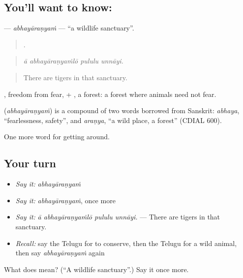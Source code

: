\subsection*{You'll want to know: }
\textbf{} — \emph{abhayāraṇyaṁ} — \textquotedblleft{}a wildlife sanctuary\textquotedblright{}.

\begin{quote}
   .
\end{quote}

\begin{quote}
\emph{ā abhayāraṇyaṁlō pululu unnāyi.}
\end{quote}

\begin{quote}
There are tigers in that sanctuary.
\end{quote}

, freedom from fear, + , a forest: a forest where animals need not fear.

\begin{cousinweb}
\textbf{} (\emph{abhayāraṇyaṁ}) is a compound of two words borrowed from Sanskrit: \emph{abhaya}, \textquotedblleft{}fearlessness, safety\textquotedblright{}, and \emph{araṇya}, \textquotedblleft{}a wild place, a forest\textquotedblright{} (CDIAL 600).
\end{cousinweb}

\begin{grammarlens}[title={What you've built}]
One more word for getting around.
\end{grammarlens}

\subsection*{Your turn}
\begin{itemize}
\raggedright
  \item \emph{Say it:} \emph{abhayāraṇyaṁ}
  \item \emph{Say it:} \emph{abhayāraṇyaṁ}, once more
  \item \emph{Say it:} \emph{ā abhayāraṇyaṁlō pululu unnāyi.} — There are tigers in that sanctuary.
  \item \emph{Recall:} say the Telugu for to conserve, then the Telugu for a wild animal, then say \emph{abhayāraṇyaṁ} again
\end{itemize}

\begin{tcolorbox}[breakable,colback=teal!4,colframe=teal!35!black,title={Before you move on}]
What does  mean? (\textquotedblleft{}A wildlife sanctuary\textquotedblright{}.) Say it once more.
\end{tcolorbox}
